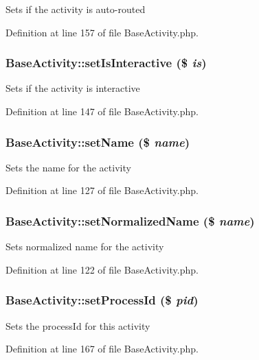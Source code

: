 Sets if the activity is auto-routed 

Definition at line 157 of file Base\-Activity.php.
\subsubsection{\setlength{\rightskip}{0pt plus 5cm}Base\-Activity::set\-Is\-Interactive (\$ {\em is})}\label{classBaseActivity_a11}


Sets if the activity is interactive 

Definition at line 147 of file Base\-Activity.php.
\subsubsection{\setlength{\rightskip}{0pt plus 5cm}Base\-Activity::set\-Name (\$ {\em name})}\label{classBaseActivity_a7}


Sets the name for the activity 

Definition at line 127 of file Base\-Activity.php.
\subsubsection{\setlength{\rightskip}{0pt plus 5cm}Base\-Activity::set\-Normalized\-Name (\$ {\em name})}\label{classBaseActivity_a6}


Sets normalized name for the activity 

Definition at line 122 of file Base\-Activity.php.
\subsubsection{\setlength{\rightskip}{0pt plus 5cm}Base\-Activity::set\-Process\-Id (\$ {\em pid})}\label{classBaseActivity_a15}


Sets the process\-Id for this activity 

Definition at line 167 of file Base\-Activity.php.
